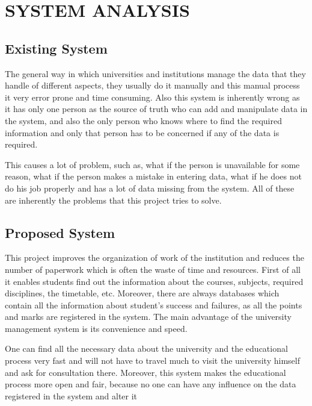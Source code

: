 \section{SYSTEM ANALYSIS}

\subsection{Existing System}

The general way in which universities and institutions manage the data that they
handle of different aspects, they usually do it manually and this manual process
it very error prone and time consuming. Also this system is inherently wrong as
it has only one person as the source of truth who can add and manipulate data in
the system, and also the only person who knows where to find the required
information and only that person has to be concerned if any of the data is
required.

This causes a lot of problem, such as, what if the person is unavailable for
some reason, what if the person makes a mistake in entering data, what if he
does not do his job properly and has a lot of data missing from the system. All
of these are inherently the problems that this project tries to solve.

\subsection{Proposed System}

This project improves the organization of work of the institution and reduces
the number of paperwork which is often the waste of time and resources. First
of all it enables students find out the information about the courses,
subjects, required disciplines, the timetable, etc. Moreover, there are always
databases which contain all the information about student’s success and
failures, as all the points and marks are registered in the system. The main
advantage of the university management system is its convenience and speed.

One can find all the necessary data about the university and the educational
process very fast and will not have to travel much to visit the university
himself and ask for consultation there. Moreover, this system makes the
educational process more open and fair, because no one can have any influence
on the data registered in the system and alter it
